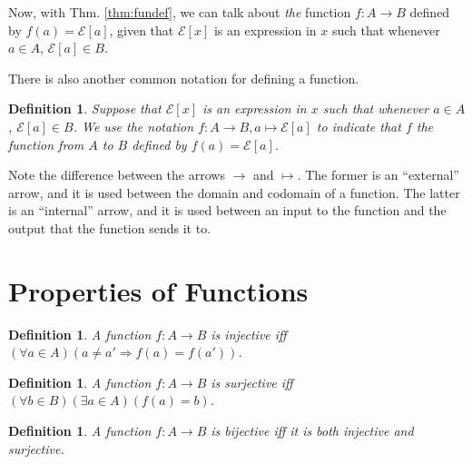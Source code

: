 \documentclass[12pt]{article}
\newcounter{dfnc}
\newtheorem{dfn}[dfnc]{Definition}
\begin{document}
Now, with Thm. \ref{thm:fundef}, we can talk about \textit{the}
function $f:A\rightarrow B$ defined by $f(a)=\mathcal{E}[a]$, given
that $\mathcal{E}[x]$ is an expression in $x$ such that whenever $a\in
A$, $\mathcal{E}[a]\in B$.

There is also another common notation for defining a function.

\begin{dfn}
  Suppose that $\mathcal{E}[x]$ is an expression in $x$ such that
  whenever $a\in A$, $\mathcal{E}[a]\in B$.  We use the notation
  $f:A\rightarrow B, a\mapsto \mathcal{E}[a]$ to indicate that $f$ the
  function from $A$ to $B$ defined by $f(a)=\mathcal{E}[a]$.
\end{dfn}

Note the difference between the arrows $\rightarrow$ and $\mapsto$.
The former is an ``external'' arrow, and it is used between the domain
and codomain of a function.  The latter is an ``internal'' arrow, and
it is used between an input to the function and the output that the
function sends it to.

\section{Properties of Functions}

\begin{dfn}
  A function $f:A\rightarrow B$ is injective iff $(\forall a\in
  A)(a\neq a' \Rightarrow f(a)=f(a'))$.
\end{dfn}

\begin{dfn}
  A function $f:A\rightarrow B$ is surjective iff $(\forall b\in
  B)(\exists a\in A)(f(a)=b)$.
\end{dfn}

\begin{dfn}
  A function $f:A\rightarrow B$ is bijective iff it is both injective
  and surjective.
\end{dfn}
\end{document}
